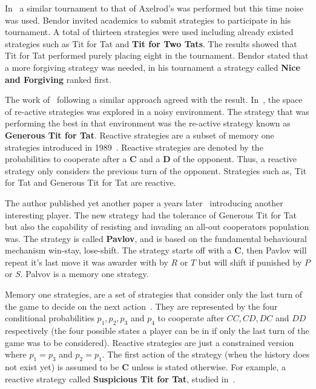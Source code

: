 \documentclass{article}
\begin{document}
In~\cite{Bendor1991} a similar tournament to that of Axelrod's was performed 
but this time noise was used. Bendor invited academics to submit strategies 
to participate in his tournament. A total of thirteen strategies were used 
including already existed strategies such as Tit for Tat and \textbf{Tit for Two 
Tats}. The results showed that Tit for Tat performed purely placing eight in
the tournament. Bendor stated that a more forgiving strategy was needed, in his
tournament a strategy called \textbf{Nice and Forgiving} ranked first.

The work of~\cite{Nowak1992} following a similar approach agreed with the result.
In~\cite{Nowak1992}, the space of re-active strategies was explored in a noisy
environment. The strategy that was performing the best in that environment was
the re-active strategy known as \textbf{Generous Tit for Tat}. Reactive strategies
are a subset of memory one strategies introduced in 1989~\cite{nowak1989}.
Reactive strategies are denoted by the probabilities to cooperate after a
\textbf{C} and a \textbf{D} of the opponent. Thus, a reactive strategy only
considers the previous turn of the opponent. Strategies such as, Tit for Tat and
Generous Tit for Tat are reactive.

The author published yet another paper a years later~\cite{Nowak1993} introducing another
interesting player. The new strategy had the tolerance of Generous Tit for Tat 
but also the capability of resisting and invading an all-out cooperators population
was. The strategy is called \textbf{Pavlov}, and is based on the fundamental
behavioural mechanism win-stay, lose-shift. The strategy starts off with a
\textbf{C}, then Pavlov will repeat it's last move it was awarder with by
\(R\) or \(T\) but will shift if punished by \(P\) or \(S\). Palvov is a memory
one strategy.

Memory one strategies, are a set of strategies that consider only the last turn
of the game to decide on the next action~\cite{Nowak1990}. They are represented
by the four conditional probabilities \(p_1, p_2, p_3\) and
\(p_4\) to cooperate after \(CC, CD, DC\) and \(DD\) respectively
(the four possible states a player can be in if only the last turn of the game was
to be considered). Reactive strategies are just a constrained version where
\(p_1=p_3\) and \(p_2=p_1\). The first action of the strategy (when the history
does not exist yet) is assumed to be \textbf{C} unless is stated otherwise. For
example, a reactive strategy called \textbf{Suspicious Tit for Tat}, studied
in~\cite{Nowak1992}.
\end{document}
